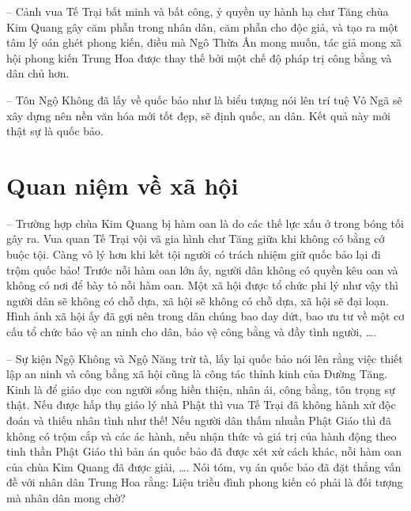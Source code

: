-- Cảnh vua Tế Trại bất minh và bất công, ỷ quyền uy hành hạ chư Tăng chùa Kim Quang gây căm phẫn trong nhân dân, căm phẫn cho độc giả, và tạo ra một tâm lý oán ghét phong kiến, điều mà Ngô Thừa Ân mong muốn, tác giả mong xã hội phong kiến Trung Hoa được thay thế bởi một chế độ pháp trị công bằng và dân chủ hơn.

-- Tôn Ngộ Không đã lấy về quốc bảo như là biểu tượng nói lên trí tuệ Vô Ngã sẽ xây dựng nên nền văn hóa mới tốt đẹp, sẽ định quốc, an dân. Kết quả này mới thật sự là quốc bảo.

\section{Quan niệm về xã hội} %
\label{sec:62_63_xa_hoi}

-- Trường hợp chùa Kim Quang bị hàm oan là do các thế lực xấu ở trong bóng tối gây ra. Vua quan Tế Trại vội vã gia hình chư Tăng giữa khi không có bằng cớ buộc tội. Càng vô lý hơn khi kết tội người có trách nhiệm giữ quốc bảo lại đi trộm quốc bảo! Trước nỗi hàm oan lớn ấy, người dân không có quyền kêu oan và không có nơi để bày tỏ nỗi hàm oan. Một xã hội được tổ chức phi lý như vậy thì người dân sẽ không có chỗ dựa, xã hội sẽ không có chỗ dựa, xã hội sẽ đại loạn. Hình ảnh xã hội ấy đã gợi nên trong dân chúng bao day dứt, bao ưu tư về một cơ cấu tổ chức bảo vệ an ninh cho dân, bảo vệ công bằng và đầy tình người, \ldots.

-- Sự kiện Ngộ Không và Ngộ Năng trừ tà, lấy lại quốc bảo nói lên rằng việc thiết lập an ninh và công bằng xã hội cũng là công tác thỉnh kinh của Đường Tăng. Kinh là để giáo dục con người sống hiền thiện, nhân ái, công bằng, tôn trọng sự thật. Nếu được hấp thụ giáo lý nhà Phật thì vua Tế Trại đã không hành xử độc đoán và thiếu nhân tình như thế! Nếu người dân thấm nhuần Phật Giáo thì đã không có trộm cắp và các ác hành, nếu nhận thức và giá trị của hành động theo tinh thần Phật Giáo thì bản án quốc bảo đã được xét xử cách khác, nỗi hàm oan của chùa Kim Quang đã được giải, \ldots. Nói tóm, vụ án quốc bảo đã đặt thẳng vấn đề với nhân dân Trung Hoa rằng: Liệu triều đình phong kiến có phải là đối tượng mà nhân dân mong chờ?
